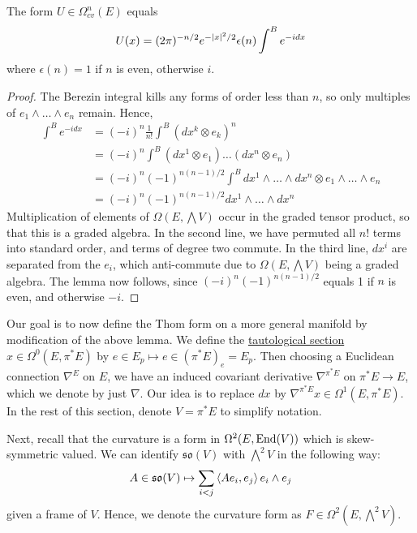 \begin{lem} \label{lem:gaussian_integral} %
	The form $U\in \Omega^n_{cv}(E)$ equals 
	\[
		 U(x) = (2\pi)^{-n/2} e^{-\abs{x}^2 /2} \epsilon(n)\int^B e^{-idx}
	\] 
	where $\epsilon(n)=1$ if  $n$ is even, otherwise  $i$.
\end{lem}
\begin{proof}
	The Berezin integral kills any forms of order less than $n$, so only
	multiples of $e_1 \wedge \ldots\wedge e_n$ remain.
	Hence,
	\begin{align*}
		\int^B e^{-idx} 
		&= (-i)^n \frac{1}{n!}\int^B (dx^k\otimes e_k)^n \\
		&= (-i)^n \int^B (dx^1\otimes e_1) \ldots(dx^n\otimes e_n) \\
		&= (-i)^n(-1)^{n(n-1)/2} \int^B dx^1\wedge \ldots\wedge dx^n\otimes e_1 \wedge\ldots\wedge e_n \\
		&= (-i)^n(-1)^{n(n-1)/2} dx^1\wedge \ldots\wedge dx^n
	\end{align*}
	Multiplication of elements of $\Omega(E,\bigwedge V)$ occur in
	the graded tensor product, so that this is a graded algebra. 
	In the second line, we have permuted all $n!$ terms into standard order, and
	terms of degree two commute.
	In the third line, $dx^i$ are separated from the  $e_i$, which
	anti-commute due to  $\Omega(E,\bigwedge V)$ being a graded algebra. 
	The lemma now follows, since
	$(-i)^n(-1)^{n(n-1)/2}$ equals 1 if $n$ is even, and otherwise  $-i$. 
\end{proof}
Our goal is to now define the Thom form on a more general manifold by 
modification of the above lemma. We define the   
\underline{tautological section} $x \in \Omega^0(E,\pi^*E)$ 
by $e\in E_p \mapsto e\in (\pi^*E)_{e} = E_{p}$.
Then choosing a Euclidean connection $\nabla^E$ on  $E$, we have an induced
covariant derivative $\nabla^{\pi^* E}$ on $\pi^* E \to E$, which we denote by
just $\nabla$.
Our idea is to replace  $dx$ by $\nabla^{\pi^*E} x \in \Omega^1(E,\pi^*E)$. 
In the rest of this section, denote $V=\pi^*E$ to simplify notation.

Next, recall that the curvature is a form in $\Omega^2(E,\operatorname{End}(V))$ 
which is skew-symmetric valued. We can identify $\mathfrak{so}(V)$ with 
$\bigwedge^2 V$ in the following way:
\begin{equation} \label{eq:so_wedge}
	A\in \mathfrak{so}(V) \mapsto \sum_{i<j} \gen{Ae_i,e_j} e_i\wedge e_j
\end{equation}
given a frame of $V$. Hence, we denote the curvature form as $F \in
\Omega^2(E,\bigwedge^2V)$.

